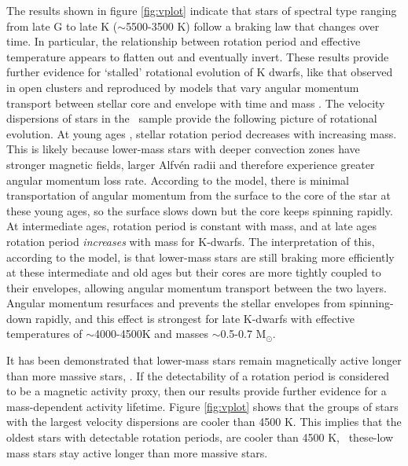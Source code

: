 The results shown in figure \ref{fig:vplot} indicate that stars of spectral
type ranging from late G to late K ($\sim$5500-3500 K) follow a braking law
that changes over time.
In particular, the relationship between rotation period and effective
temperature appears to flatten out and eventually invert.
These results provide further evidence for `stalled' rotational evolution of K
dwarfs, like that observed in open clusters \citep{curtis2019} and reproduced
by models that vary angular momentum transport between stellar core and
envelope with time and mass \citep{spada2019}.
The velocity dispersions of stars in the \mct\ sample provide the following
picture of rotational evolution.
At young ages \citep[younger than around 1 Gyr but still old enough to be on
the main sequence and have transitioned from the `I' sequence to the `C'
sequence ][]{barnes2003}, stellar rotation period decreases with increasing
mass.
This is likely because lower-mass stars with deeper convection zones have
stronger magnetic fields, larger Alfv\'en radii and therefore experience
greater angular momentum loss rate.
According to the \citet{spada2019} model, there is minimal transportation of
angular momentum from the surface to the core of the star at these young ages,
so the surface slows down but the core keeps spinning rapidly.
At intermediate ages, rotation period is constant with mass, and at late ages
rotation period {\it increases} with mass for K-dwarfs.
The interpretation of this, according to the \citet{spada2019} model, is that
lower-mass stars are still braking more efficiently at these intermediate and
old ages but their cores are more tightly coupled to their envelopes, allowing
angular momentum transport between the two layers.
Angular momentum resurfaces and prevents the stellar envelopes from
spinning-down rapidly, and this effect is strongest for late K-dwarfs with
effective temperatures of $\sim$4000-4500K and masses $\sim$0.5-0.7 M$_\odot$.

It has been demonstrated that lower-mass stars remain magnetically active
longer than more massive stars, \citep[\eg][]{west2008, kiman2019}.
If the detectability of a rotation period is considered to be a magnetic
activity proxy, then our results provide further evidence for a mass-dependent
activity lifetime.
Figure \ref{fig:vplot} shows that the groups of stars with the largest
velocity dispersions are cooler than 4500 K.
This implies that the oldest stars with detectable rotation periods, are
cooler than 4500 K, \ie\ these-low mass stars stay active longer than more
massive stars.

